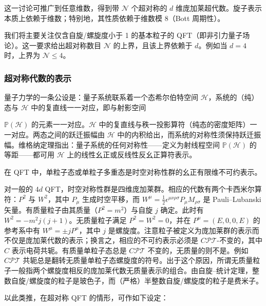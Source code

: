 这一讨论可推广到任意维数，得到带 $\mathcal{N}$ 个超对称的 $d$ 维庞加莱超代数。旋子表示本质上依赖于维数；特别地，其性质依赖于维数模 8（Bott 周期性）。

我们将主要关注仅含自旋/螺旋度小于 1 的基本粒子的 QFT（即非引力量子场论）。这一要求给出超对称数目 $\mathcal{N}$ 的上界，且该上界依赖于 $d$。例如当 $d=4$ 时，上界为 $\mathcal{N}\le 4$。

\subsubsection*{超对称代数的表示}

量子力学的一条公设是：量子系统联系着一个态希尔伯特空间 $\mathcal{H}$，系统的（纯）态与 $\mathcal{H}$ 中的复直线一一对应，即与射影空间

$\mathbb{P}(\mathcal{H})$ 的元素一一对应。$\mathcal{H}$ 中的复直线与秩一投影算符（纯态的密度矩阵）一一对应。两态之间的跃迁振幅由 $\mathcal{H}$ 中的内积给出，而系统的对称性须保持跃迁振幅。维格纳定理指出：量子系统的任何对称性——定义为射线程空间 $\mathbb{P}(\mathcal{H})$ 的等距——都可用 $\mathcal{H}$ 上的线性幺正或反线性反幺正算符表示。

\begin{definition}[17.2] 在 QFT 中，单粒子态或单粒子多重态是时空对称性群的幺正有限维不可约表示。\end{definition}

对一般的 $4d$ QFT，时空对称性群是四维庞加莱群。相应的代数有两个卡西米尔算符：$P^2$ 与 $W^2$，其中 $P_\mu$ 生成时空平移，而 $W^\mu=\frac{1}{2}\epsilon^{\mu\nu\rho\sigma}P_\mu M_{\rho\sigma}$ 是 Pauli–Lubanski 矢量。有质量粒子由其质量（$P^2=m^2$）与自旋 $j$ 确定。此时有 $W^2=-m^2j(j+1)$。无质量粒子满足 $P^2=W^2=0$，并在 $P^\mu=(E,0,0,E)$ 的参考系中有 $W^\mu=\pm jP^\mu$，其中 $j$ 是螺旋度。注意粒子被定义为庞加莱群的表示而不仅是庞加莱代数的表示；换言之，相应的不可约表示必须是 $C\mathcal{PT}$-不变的，其中 $C$ 表示电荷共轭。有质量单粒子态总是 $C\mathcal{PT}$ 不变的，无质量的则不是。例如 $C\mathcal{PT}$ 共轭总是翻转无质量单粒子态螺旋度的符号。出于这个原因，所谓无质量粒子一般指两个螺旋度相反的庞加莱代数无质量表示的组合。由自旋–统计定理，整数自旋/螺旋度的粒子是玻色子，而（严格）半整数自旋/螺旋度的粒子是费米子。

以此类推，在超对称 QFT 的情形，可作如下设定：


